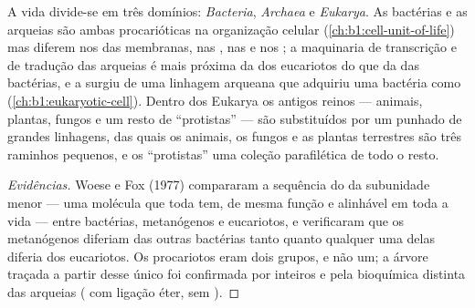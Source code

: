 \begin{proposition}\label{prop:b1:classifying-biodiversity:domains}
A vida divide-se em três domínios: \emph{Bacteria}, \emph{Archaea} e
\emph{Eukarya}. As bactérias e as arqueias são ambas procarióticas na
organização celular (\cref{ch:b1:cell-unit-of-life}) mas diferem nos
 das membranas, nas , nas  e
nos ; a maquinaria de transcrição e de tradução das arqueias
é mais próxima da dos eucariotos do que da das bactérias, e a  surgiu de uma linhagem arqueana que adquiriu uma bactéria
como  (\cref{ch:b1:eukaryotic-cell}). Dentro dos Eukarya os
antigos reinos --- animais, plantas, fungos e um resto de
``protistas'' --- são substituídos por um punhado de grandes linhagens,
das quais os animais, os fungos e as plantas terrestres são três
raminhos pequenos, e os ``protistas'' uma coleção parafilética de todo
o resto.
\end{proposition}
\begin{proof}[Evidências]
Woese e Fox (1977) compararam a sequência do  da
subunidade menor --- uma molécula que toda  tem, de mesma função
e alinhável em toda a vida --- entre bactérias, metanógenos e
eucariotos, e verificaram que os metanógenos diferiam das outras
bactérias tanto quanto qualquer uma delas diferia dos eucariotos. Os
procariotos eram dois grupos, e não um; a árvore traçada a partir desse
único  foi confirmada por  inteiros e pela bioquímica
distinta das arqueias ( com ligação éter, sem ).
\end{proof}

